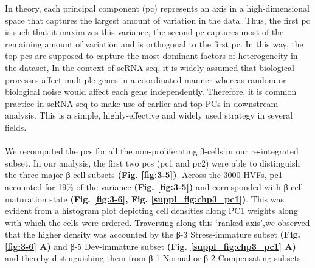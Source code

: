 In theory, each principal component (\gls{pc}) represents an axis in a high-dimensional space that captures the largest amount of variation in the data. Thus, the first \gls{pc} is such that it maximizes this variance, the second \gls{pc} captures most of the remaining amount of variation and is orthogonal to the first \gls{pc}. In this way, the top \glspl{pc} are supposed to capture the most dominant factors of heterogeneity in the dataset, In the context of scRNA-seq, it is widely assumed that biological processes affect multiple genes in a coordinated manner whereas random or biological noise would affect each gene independently. %
Therefore, it is common practice in scRNA-seq to make use of earlier and top PCs in downstream analysis. This is a simple, highly-effective and widely used strategy in several fields.\\\\

We recomputed the \glspl{pc} for all the non-proliferating β-cells in our re-integrated subset. In our analysis, the first two \glspl{pc} (\gls{pc}1 and \gls{pc}2) were able to distinguish the three major β-cell subsets \textbf{(Fig. \ref{fig:3-5})}. Across the 3000 HVFs, \gls{pc}1 accounted for 19\% of the variance \textbf{(Fig. \ref{fig:3-5})} and corresponded with β-cell maturation state \textbf{(Fig. \ref{fig:3-6}, Fig. \ref{suppl_fig:chp3_pc1})}. This was evident from a histogram plot depicting cell densities along PC1 weights along with which the cells were ordered. Traversing along this `ranked axis’,we observed  that the higher density was accounted by the β-3 Stress-immature subset \textbf{(Fig. \ref{fig:3-6} A)} and β-5 Dev-immature subset \textbf{(Fig. \ref{suppl_fig:chp3_pc1} A)} and thereby distinguishing them from β-1 Normal or β-2 Compensating subsets.


